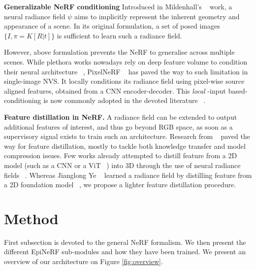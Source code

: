 \noindent\textbf{Generalizable NeRF conditioning} Introduced in Mildenhall's \etal ~\citep{mildenhall2020nerf} work, a neural radiance field $\psi$ aims to implicitly represent the inherent geometry and appearance of a scene. In its original formulation, a set of posed images $\{I,\pi = K[R|t]\}$ is sufficient to learn such a radiance field.

However, above  formulation prevents the NeRF to generalise across multiple scenes. While plethora works nowadays rely on deep feature volume to condition their neural architecture ~\citep{wang2021ibrnet,chen2023matchnerf}, PixelNeRF ~\citep{yu2021pixelnerf} has paved the way to such limitation in single-image NVS. It locally conditions its radiance field using pixel-wise source aligned features, obtained from a CNN encoder-decoder. This \textit{local} -input based- conditioning is now commonly adopted in the devoted literature ~\citep{jang2021codenerf,li2022symmnerf,lin2023vision}.

\noindent\textbf{Feature distillation in NeRF.} A radiance field can be extended to output additional features of interest, and thus go beyond RGB space, as soon as a supervisory signal exists to train such an architecture.  Research from ~\citep{hinton2015distilling} paved the way for feature distillation, mostly to tackle both knowledge transfer and model compression issues. Few works already attempted to distill feature from a 2D model (such as a CNN or a ViT ~\citep{dosovitskiy2020vit}) into 3D through the use of neural radiance fields ~\citep{kobayashi2022decomposing}.  Whereas Jianglong Ye \etal ~\citep{ye2023featurenerf} learned a radiance field  by distilling feature from a 2D foundation model ~\citep{oquab2023dinov2}, we propose a lighter feature distillation procedure. 

\section{Method}
First subsection is devoted to the general NeRF formalism. We then present the different EpiNeRF sub-modules and how they have been trained. We present an overview of our architecture on Figure \ref{fig:overview}. 

